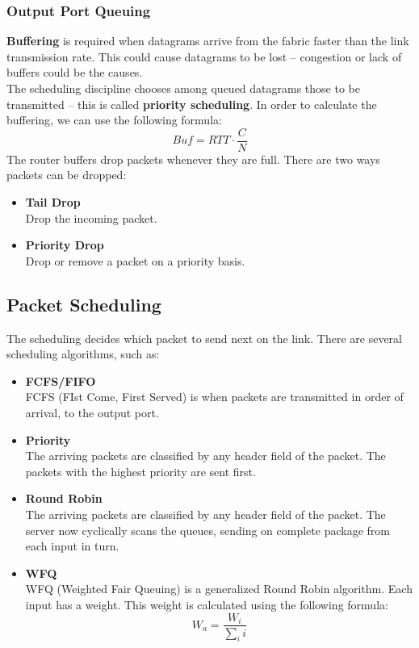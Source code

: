 \documentclass{article}
\begin{document}
\subsubsection{Output Port Queuing}
\textbf{Buffering} is required when datagrams arrive from the fabric faster than the link transmission rate. This could cause datagrams to be lost -- congestion or lack of buffers could be the causes. \\
The scheduling discipline chooses among queued datagrams those to be transmitted -- this is called \textbf{priority scheduling}. In order to calculate the buffering, we can use the following formula:
\[ Buf = RTT \cdot \frac{C}{N} \]
The router buffers drop packets whenever they are full. There are two ways packets can be dropped:

\begin{itemize}
	\item \textbf{Tail Drop}
	\vspace{.2cm} \\
	Drop the incoming packet.
	
	\item \textbf{Priority Drop}
	\vspace{.2cm} \\
	Drop or remove a packet on a priority basis.
\end{itemize}

\subsection{Packet Scheduling}
The scheduling decides which packet to send next on the link. There are several scheduling algorithms, such as:

\begin{itemize}
	\item \textbf{FCFS/FIFO}
	\vspace{.2cm} \\
	FCFS (FIst Come, First Served) is when packets are transmitted in order of arrival, to the output port.
	
	\item \textbf{Priority}
	\vspace{.2cm	} \\
	The arriving packets are classified by any header field of the packet. The packets with the highest priority are sent first.
	
	\item \textbf{Round Robin}
	\vspace{.2cm} \\
	The arriving packets are classified by any header field of the packet. The server now cyclically scans the queues, sending on complete package from each input in turn.
	
	\item \textbf{WFQ}
	\vspace{.2cm} \\
	WFQ (Weighted Fair Queuing) is a generalized Round Robin algorithm. Each input has a weight. This weight is calculated using the following formula: \\
	\[ W_a = \frac{W_i}{\sum_i i} \]
\end{itemize}
\end{document}
